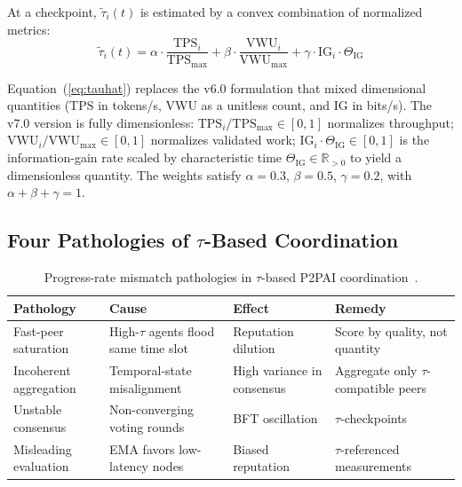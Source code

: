 \documentclass[11pt,a4paper]{article}
\theoremstyle{plain}
\theoremstyle{definition}
\theoremstyle{remark}
\newcommand{\tauhat}{\tilde{\tau}}
\begin{document}
At a checkpoint, $\tauhat_i(t)$ is estimated by a convex combination of normalized metrics:
\begin{equation}
  \tauhat_i(t) = \alpha \cdot \frac{\mathrm{TPS}_i}{\mathrm{TPS}_{\max}}
               + \beta  \cdot \frac{\mathrm{VWU}_i}{\mathrm{VWU}_{\max}}
               + \gamma \cdot \mathrm{IG}_i \cdot \Theta_{\mathrm{IG}}
  \label{eq:tauhat}
\end{equation}

\begin{correction}
Equation~(\ref{eq:tauhat}) replaces the v6.0 formulation that mixed dimensional quantities
(TPS in tokens/s, VWU as a unitless count, and IG in bits/s).  The v7.0 version is fully
dimensionless:
$\mathrm{TPS}_i / \mathrm{TPS}_{\max} \in [0,1]$ normalizes throughput;
$\mathrm{VWU}_i / \mathrm{VWU}_{\max} \in [0,1]$ normalizes validated work;
$\mathrm{IG}_i \cdot \Theta_{\mathrm{IG}} \in [0,1]$ is the information-gain rate scaled by
characteristic time $\Theta_{\mathrm{IG}} \in \mathbb{R}_{>0}$ to yield a dimensionless quantity.
The weights satisfy $\alpha = 0.3$, $\beta = 0.5$, $\gamma = 0.2$, with $\alpha + \beta + \gamma = 1$.
\end{correction}

\subsection{Four Pathologies of \texorpdfstring{$\tau$}{tau}-Based Coordination}

\begin{table}[ht]
\centering
\caption{Progress-rate mismatch pathologies in \texorpdfstring{$\tau$}{tau}-based P2PAI coordination~\cite{almayahi2018}.}
\label{tab:pathologies}
\small
\begin{tabular}{@{}p{2.8cm}p{3.8cm}p{2.8cm}p{3.2cm}@{}}
\toprule
\textbf{Pathology} & \textbf{Cause} & \textbf{Effect} & \textbf{Remedy} \\
\midrule
Fast-peer saturation    & High-$\tau$ agents flood same time slot & Reputation dilution     & Score by quality, not quantity \\
Incoherent aggregation  & Temporal-state misalignment            & High variance in consensus & Aggregate only $\tau$-compatible peers \\
Unstable consensus      & Non-converging voting rounds           & BFT oscillation         & $\tau$-checkpoints \\
Misleading evaluation   & EMA favors low-latency nodes           & Biased reputation       & $\tau$-referenced measurements \\
\bottomrule
\end{tabular}
\end{table}
\end{document}

